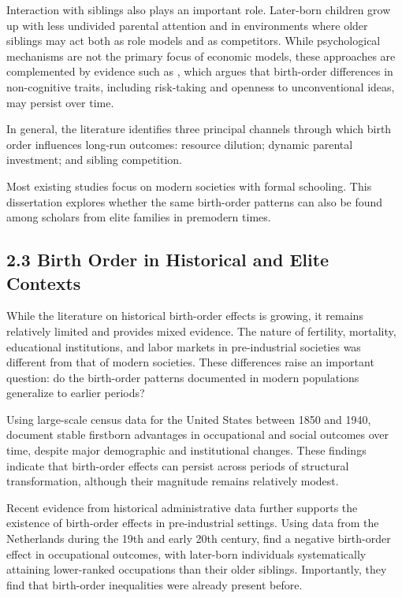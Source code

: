 Interaction with siblings also plays an important role. Later-born children grow up with less undivided parental attention and in environments where older siblings may act both as role models and as competitors. While psychological mechanisms are not the primary focus of economic models, these approaches are complemented by evidence such as \cite{Sulloway1996}, which argues that birth-order differences in non-cognitive traits, including risk-taking and openness to unconventional ideas, may persist over time.

In general, the literature identifies three principal channels through which birth order influences long-run outcomes: resource dilution; dynamic parental investment; and sibling competition.

Most existing studies focus on modern societies with formal schooling. This dissertation explores whether the same birth-order patterns can also be found among scholars from elite families in premodern times.

\subsection*{2.3 Birth Order in Historical and Elite Contexts}

While the literature on historical birth-order effects is growing, it remains relatively limited and provides mixed evidence. The nature of fertility, mortality, educational institutions, and labor markets in pre-industrial societies was different from that of modern societies. These differences raise an important question: do the birth-order patterns documented in modern populations generalize to earlier periods?

Using large-scale census data for the United States between 1850 and 1940, \cite{cools2024birth} document stable firstborn advantages in occupational and social outcomes over time, despite major demographic and institutional changes. These findings indicate that birth-order effects can persist across periods of structural transformation, although their magnitude remains relatively modest.

Recent evidence from historical administrative data further supports the existence of birth-order effects in pre-industrial settings. Using data from the Netherlands during the 19th and early 20th century, \cite{nuevo2022birth} find a negative birth-order effect in occupational outcomes, with later-born individuals systematically attaining lower-ranked occupations than their older siblings. Importantly, they find that birth-order inequalities were already present before.

